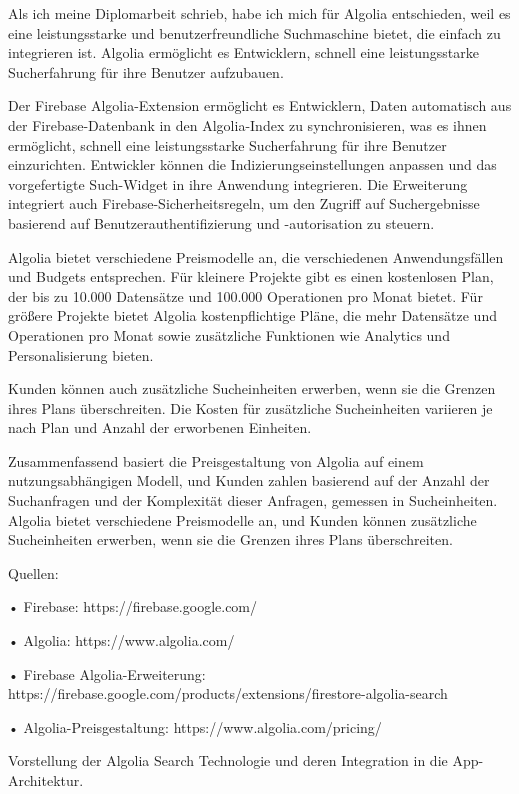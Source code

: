 Als ich meine Diplomarbeit schrieb, habe ich mich für Algolia entschieden, weil es eine leistungsstarke und benutzerfreundliche Suchmaschine bietet, die einfach zu integrieren ist. Algolia ermöglicht es Entwicklern, schnell eine leistungsstarke Sucherfahrung für ihre Benutzer aufzubauen.

Der Firebase Algolia-Extension ermöglicht es Entwicklern, Daten automatisch aus der Firebase-Datenbank in den Algolia-Index zu synchronisieren, was es ihnen ermöglicht, schnell eine leistungsstarke Sucherfahrung für ihre Benutzer einzurichten. Entwickler können die Indizierungseinstellungen anpassen und das vorgefertigte Such-Widget in ihre Anwendung integrieren. Die Erweiterung integriert auch Firebase-Sicherheitsregeln, um den Zugriff auf Suchergebnisse basierend auf Benutzerauthentifizierung und -autorisation zu steuern.

Algolia bietet verschiedene Preismodelle an, die verschiedenen Anwendungsfällen und Budgets entsprechen. Für kleinere Projekte gibt es einen kostenlosen Plan, der bis zu 10.000 Datensätze und 100.000 Operationen pro Monat bietet. Für größere Projekte bietet Algolia kostenpflichtige Pläne, die mehr Datensätze und Operationen pro Monat sowie zusätzliche Funktionen wie Analytics und Personalisierung bieten.

Kunden können auch zusätzliche Sucheinheiten erwerben, wenn sie die Grenzen ihres Plans überschreiten. Die Kosten für zusätzliche Sucheinheiten variieren je nach Plan und Anzahl der erworbenen Einheiten.

Zusammenfassend basiert die Preisgestaltung von Algolia auf einem nutzungsabhängigen Modell, und Kunden zahlen basierend auf der Anzahl der Suchanfragen und der Komplexität dieser Anfragen, gemessen in Sucheinheiten. Algolia bietet verschiedene Preismodelle an, und Kunden können zusätzliche Sucheinheiten erwerben, wenn sie die Grenzen ihres Plans überschreiten.

Quellen:

•	Firebase: https://firebase.google.com/

•	Algolia: https://www.algolia.com/

•	Firebase Algolia-Erweiterung: https://firebase.google.com/products/extensions/firestore-algolia-search

•	Algolia-Preisgestaltung: https://www.algolia.com/pricing/




Vorstellung der Algolia Search Technologie und deren
Integration in die App-Architektur.

